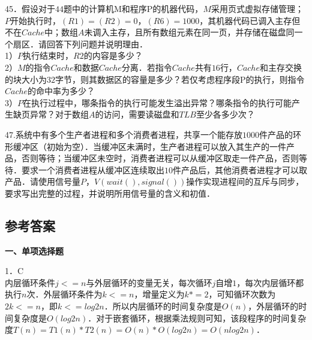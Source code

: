 45．假设对于$44$题中的计算机M和程序P的机器代码，$M$采用页式虚拟存储管理；$P$开始执行时，$(R1)=(R2)=0$，$(R6)=1000$，其机器代码已调入主存但不在$Cache$中；数组$A$未调入主存，且所有数组元素在同一页，并存储在磁盘同一个扇区．请回答下列问题并说明理由． \\
1）$P$执行结束时，$R2$的内容是多少？  \\
2）$M$的指令$Cache$和数据$Cache$分离．若指令$Cache$共有$16$行，$Cache$和主存交换的块大小为$32$字节，则其数据区的容量是多少？若仅考虑程序段P的执行，则指令$Cache$的命中率为多少？  \\
3）$P$在执行过程中，哪条指令的执行可能发生溢出异常？哪条指令的执行可能产生缺页异常？对于数组$A$的访问，需要读磁盘和$TLB$至少各多少次？

47.系统中有多个生产者进程和多个消费者进程，共享一个能存放$1000$件产品的环形缓冲区（初始为空）．当缓冲区未满时，生产者进程可以放入其生产的一件产品，否则等待；当缓冲区未空时，消费者进程可以从缓冲区取走一件产品，否则等待．要求一个消费者进程从缓冲区连续取出$10$件产品后，其他消费者进程才可以取产品．请使用信号量$P$，$V(wait(),signal())$操作实现进程间的互斥与同步，要求写出完整的过程，并说明所用信号量的含义和初值．

\subsection{参考答案}

\textbf{一、单项选择题}

1．C \\
内层循环条件$j<=n$与外层循环的变量无关，每次循环$j$自增$1$，每次内层循环都执行$n$次．外层循环条件为$k<=n$，增量定义为$k*=2$，可知循环次数为$2k<=n$，即$k<=log2n$．所以内层循环的时间复杂度是$O(n)$，外层循环的时间复杂度是$O(log2n)$．对于嵌套循环，根据乘法规则可知，该段程序的时间复杂度$T(n)=T1(n)*T2(n)=O(n)*O(log2n)=O(nlog2n)$．


